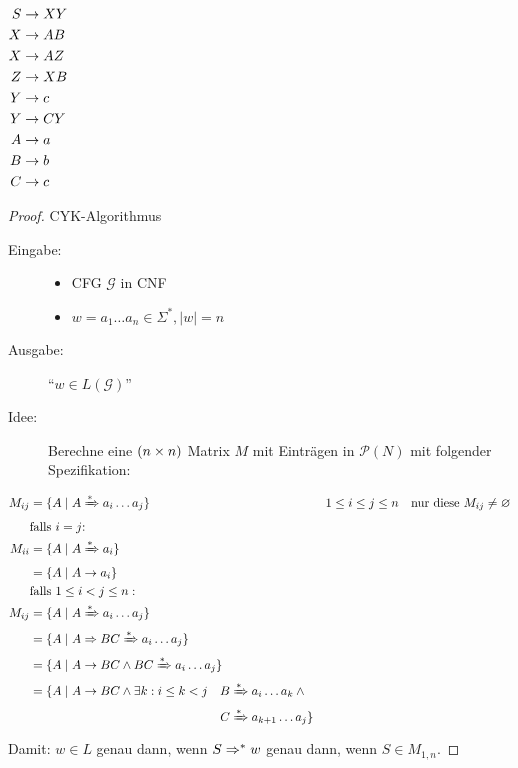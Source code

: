 	$\begin{aligned}[t]
		S &\-> XY\\
		X &\-> AB\\
		X &\-> AZ\\
		Z &\-> XB\\
		Y &\-> c\\
		Y &\-> CY\\
		A &\-> a\\
		B &\-> b\\
		C &\-> c
	\end{aligned}$\quad
\begin{proof}
		\ac{CYK}-Algorithmus
		\begin{description}
	    \item[Eingabe:]
		\begin{itemize}
			\item \ac{CFG} $\mathcal{G}$ in \ac{CNF}
			\item $w = a_1\dots a_n\in\Sigma^*, |w|=n$
		\end{itemize}
		\item[Ausgabe:] "`$w\in L(\mathcal{G})$"'
		\item[Idee:] Berechne eine $(n\times n)$ Matrix $M$ mit Einträgen in $\mathcal{P}(N)$ mit folgender Spezifikation:
		\end{description}
	\begin{align*}
		M_{ij} &= \{ A \mid A\xRightarrow{*} a_i\dots a_j \} && 1\leq i\leq j\leq n \quad\text{nur diese }M_{ij}\neq \varnothing\\
		& \text{falls $i=j$:}\\
		M_{ii} &= \{ A \mid A\xRightarrow{*} a_i\}\\
		&= \{A \mid A\-> a_i \} \\
		&\text{falls }1\leq i<j\leq n:\\
		M_{ij} &= \{ A \mid A\xRightarrow{*} a_i\dots a_j \}\\
		&= \{ A \mid A\=> BC \xRightarrow{*} a_i\dots a_j \}\\
		&= \{ A \mid A\-> BC \land BC \xRightarrow{*} a_i\dots a_j \}\\
		&= \{ A \mid A\-> BC \land \exists k: i\leq k<j\quad 
			\begin{aligned}[t]
				B &\xRightarrow{*} a_i\dots a_k \land{}\\
				C &\xRightarrow{*} a_{k+1}\dots a_j \}
			\end{aligned}\\
	\end{align*}
	Damit: $w\in L$ genau dann, wenn $S \=>^* w$ genau dann, wenn $S \in M_{1,n}$.
	

\end{proof}
